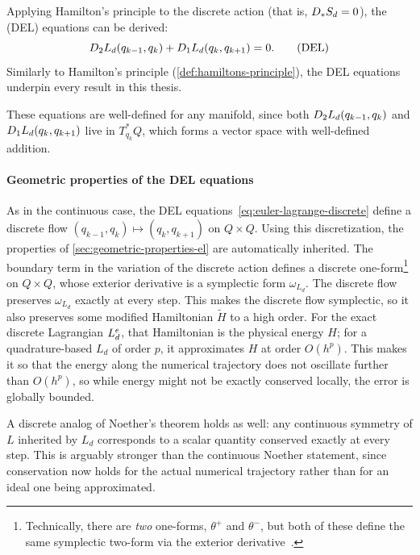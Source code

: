 Applying Hamilton's principle to the discrete action (that is, $D_{*}{S_d} = 0$), the  (DEL) equations can be derived:
\begin{equation}
	D_{2} L_d (q_{k-1}, q_k) + D_{1} L_d (q_k, q_{k+1}) = 0.
	\label{eq:euler-lagrange-discrete}
	\tag{DEL}
\end{equation}
Similarly to Hamilton's principle (\cref{def:hamiltons-principle}), the DEL equations underpin every result in this thesis.

These equations are well-defined for any manifold, since both $D_{2} L_d (q_{k-1}, q_k)$ and $D_{1} L_d (q_k, q_{k+1})$ live in $T^*_{q_k} Q$, which forms a vector space with well-defined addition.

\paragraph{Geometric properties of the DEL equations} As in the continuous case, the DEL equations~\eqref{eq:euler-lagrange-discrete} define a discrete flow $(q_{k-1}, q_k) \mapsto (q_k, q_{k+1})$ on $Q \times Q$. Using this discretization, the properties of \cref{sec:geometric-properties-el} are automatically inherited. The boundary term in the variation of the discrete action defines a discrete one-form\footnote{Technically, there are \emph{two} one-forms, $\theta^+$ and $\theta^-$, but both of these define the same symplectic two-form via the exterior derivative~\cite[p. 15]{marsdenDiscreteMechanicsVariational2001}.} on $Q \times Q$, whose exterior derivative is a symplectic form $\omega_{L_d}$. The discrete flow preserves $\omega_{L_d}$ exactly at every step. This makes the discrete flow symplectic, so it also preserves some modified Hamiltonian $\widetilde H$ to a high order. For the exact discrete Lagrangian $L_d^e$, that Hamiltonian is the physical energy $H$; for a quadrature-based $L_d$ of order $p$, it approximates $H$ at order $O(h^p)$. This makes it so that the energy along the numerical trajectory does not oscillate further than $O(h^p)$, so while energy might not be exactly conserved locally, the error is globally bounded. 

A discrete analog of Noether's theorem holds as well: any continuous symmetry of $L$ inherited by $L_d$ corresponds to a scalar quantity conserved exactly at every step. This is arguably stronger than the continuous Noether statement, since conservation now holds for the actual numerical trajectory rather than for an ideal one being approximated.


